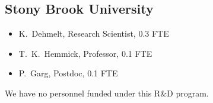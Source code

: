 \subsection{Stony Brook University}
\begin{itemize}
\item K.~Dehmelt, Research Scientist, 0.3 FTE
\item T.~K.~Hemmick, Professor, 0.1 FTE
\item P.~Garg, Postdoc, 0.1 FTE
\end{itemize}
We have no personnel funded under this R\&D program.